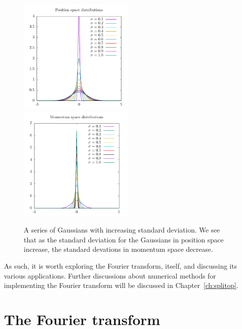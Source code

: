 \begin{figure}

\includegraphics[width = 0.5\textwidth]{data/qs/Heisenberg/position.pdf}
\includegraphics[width = 0.5\textwidth]{data/qs/Heisenberg/momentum.pdf}

\caption{A series of Gaussians with increasing standard deviation. We see that as the standard deviation for the Gaussians in position space increase, the standard devations in momentum space decrease.}
\label{fig:uncertain}
\end{figure}


As such, it is worth exploring the Fourier transform, itself, and discussing its various applications.
Further discussions about numerical methods for implementing the Fourier transform will be discussed in Chapter~\ref{ch:splitop}.


\section{The Fourier transform}

